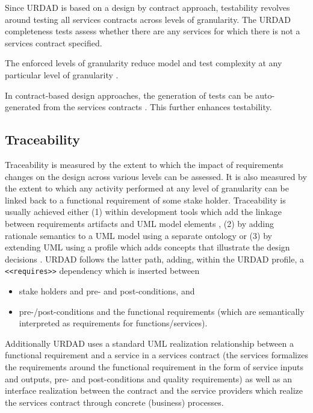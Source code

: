 Since URDAD is based on a design by contract \cite{meyer_1992:designByContract} approach, testability revolves around testing all services contracts \cite{nebut_2006:automaticTestGeneration, Zheng_2008:testByContract} across levels of granularity. The URDAD completeness tests assess whether there are any services for which there is not a services contract specified.

The enforced levels of granularity reduce model and test complexity at any particular level of granularity \cite{wang_2008:componentOrientedDevelopmentApproachToEbusinessApplications}.


In contract-based design approaches, the generation of tests can be auto-generated from the services contracts \cite{nebut_2003:requirementsByContractsAutomateTests,nebut_2006:automaticTestGeneration,hakim_2008:automatedTests}. This further enhances testability.



\subsection{Traceability}

Traceability is measured by the extent to which the impact of requirements changes on the design across various levels can be assessed. It is also measured by the extent to which any activity performed at any level of granularity can be linked back to a functional requirement of some stake holder. Traceability is usually achieved either (1) within development tools which add the linkage between requirements artifacts and UML model elements \cite{dick_2005:designTraceability}, (2) by adding rationale semantics to a UML model using a separate ontology \cite{noll_2007:traceabilityUsingOntologies} or (3) by extending UML using a profile which adds concepts that illustrate the design decisions \cite{zhu_2007:umlProfileForDesignDecisions}. URDAD follows the latter path, adding, within the URDAD profile, a \verb+<<requires>>+ dependency which is inserted between
\begin{itemize}
  \item stake holders and pre- and post-conditions, and
  \item pre-/post-conditions and the functional requirements (which are semantically interpreted as requirements for functions/services).
\end{itemize}

Additionally URDAD uses a standard UML realization relationship between a functional requirement and a service in a services contract (the services formalizes the requirements around the functional requirement in the form of service inputs and outputs, pre- and post-conditions and quality requirements) as well as an interface realization between the contract and the service providers which realize the services contract through concrete (business) processes.

